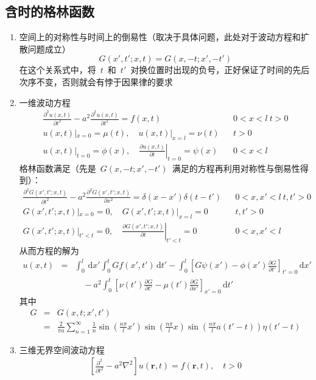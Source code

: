 \documentclass[12pt,a4paper]{article}
\newcommand\diff{\,\mathrm{d}}
\renewcommand*{\vec}[1]{\bm{#1}}%
\renewcommand{\[}{\ $\displaystyle}
\renewcommand{\]}{$\ }%
\newcommand{\pard}[2]{\ensuremath{\frac{\partial #1}{\partial #2}}}
\newcommand{\pardsq}[2]{\ensuremath{\frac{\partial^2 #1}{\partial #2^2}}}
\newcommand{\summ}[2][n]{\sum_{#1=#2}^\infty}
\begin{document}
	\subsection{含时的格林函数}
	  \begin{enumerate}
	   \item 空间上的对称性与时间上的倒易性（取决于具体问题，此处对于波动方程和扩散问题成立）
	    $$
	      G(x',t';x,t) = G(x,-t;x',-t')
	    $$
	    在这个关系式中，将\[t\]和\[t'\]对换位置时出现的负号，正好保证了时间的先后次序不变，否则就会有悖于因果律的要求
	    \item 一维波动方程
	    	\begin{eqnarray*}
	    	 \pardsq{u(x,t)}{t} - a^2\pardsq{u(x,t)}{t} = f(x,t) &&0<x<l~t>0 \\
	    	 u(x,t)|_{x=0} = \mu(t),\quad u(x,t)|_{x=l} = \nu(t) &&t>0\\
	    	 u(x,t)|_{t=0} = \phi(x),\quad \left.\pard{u(x,t)}{t}\right|_{t=0} = \psi(x) &&0<x<l
	    	\end{eqnarray*}
	    	格林函数满足（先是\[G(x,-t;x',-t')\]满足的方程再利用对称性与倒易性得到）：
	    	\begin{eqnarray*}
	    	 \pardsq{G(x',t';x,t)}{t} - a^2\pardsq{G(x',t';x,t)}{x} = \delta(x-x')\delta(t-t') &&0<x,x'<l~t,t'>0 \\
	    	 G(x',t';x,t)|_{x=0} = 0,\quad G(x',t';x,t)|_{x=l} = 0 &&t,t'>0\\
	    	 G(x',t';x,t)|_{t'<t} = 0,\quad \left.\pard{G(x',t';x,t)}{t}\right|_{t'<t} = 0 &&0<x,x'<l
	    	\end{eqnarray*}
	    	从而方程的解为
	    	\begin{eqnarray*}
	    	 u(x,t) &=& \int_0^l\diff x'\int_0^t Gf(x',t')\diff t' - \int_0^l\left[G\psi(x') - \phi(x')\pard{G}{t'}\right]_{t'=0}\diff x' \\
	    	 && \quad - a^2\int_0^t\left[\nu(t')\pard{G}{t'} - \mu(t')\pard{G}{x'}\right]_{x'=0}\diff t'
	    	\end{eqnarray*}
	    	其中
	    	\begin{eqnarray*}
	    	 G &=& G(x,t;x',t') \\
	    	  &=&\frac{2}{\pi a}\summ{1}\frac{1}{n}\sin\left(\frac{n\pi}{l}x'\right)\sin\left(\frac{n\pi}{l}x\right)\sin\left(\frac{n\pi}{l}a(t'-t)\right)\eta(t'-t)
	    	\end{eqnarray*}
	    \item 三维无界空间波动方程
	    	\begin{eqnarray*}
	    	  \left[\pardsq{}{t} - a^2\nabla^2\right]u(\vec r ,t) = f(\vec r,t),\quad t>0 \\

\end{eqnarray*}
\end{enumerate}
\end{document}
